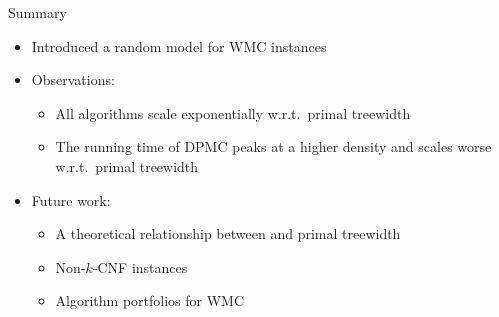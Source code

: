\documentclass{beamer}
\begin{document}
\begin{frame}{Summary}
  \begin{itemize}
    \item Introduced a random model for WMC instances
    \item Observations:
    \begin{itemize}
      \item All algorithms scale exponentially w.r.t.\ primal treewidth
      \item The running time of \textsc{DPMC} peaks at a higher density and
      scales worse w.r.t.\ primal treewidth
    \end{itemize}
    \item Future work:
    \begin{itemize}
      \item A theoretical relationship between \structure{$\rho$} and primal treewidth
      \item Non-$k$-CNF instances
      \item Algorithm portfolios for WMC
    \end{itemize}
  \end{itemize}
\end{frame}
\end{document}
